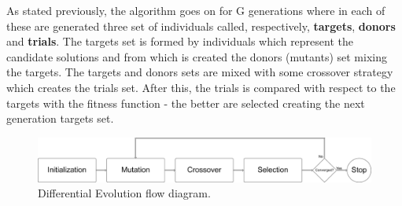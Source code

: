 As stated previously, the algorithm goes on for G generations where in each of these are generated three set of individuals called, respectively, \textbf{targets}, \textbf{donors} and \textbf{trials}. The targets set is formed by individuals which represent the candidate solutions and from which is created the donors (mutants) set mixing the targets. The targets and donors sets are mixed with some crossover strategy which creates the trials set. After this, the trials is compared with respect to the targets with the fitness function - the better are selected creating the next generation targets set. \\

\begin{figure}[t]
	\centering
	\includegraphics[width=\textwidth]{figures/de-flow.png}
	\caption{Differential Evolution flow diagram.}
\end{figure}


